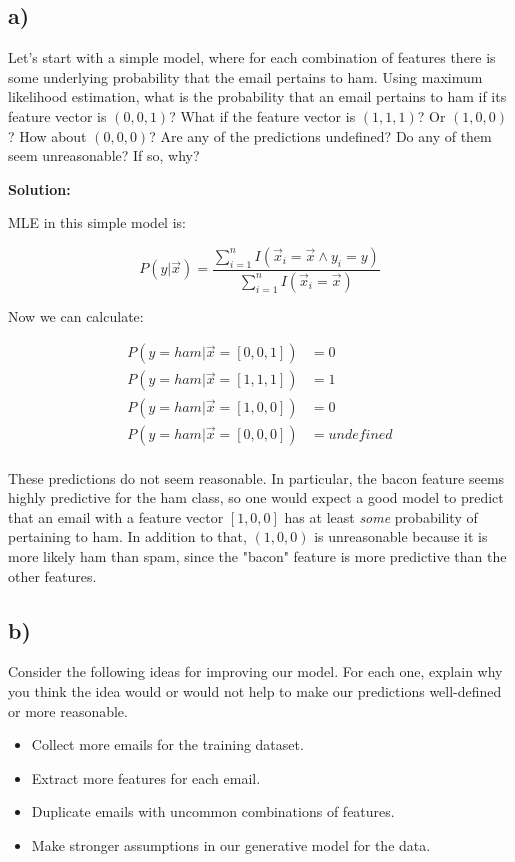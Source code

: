 \documentclass[a4paper]{article}
\begin{document}
\subsection*{a)}
Let's start with a simple model, where for each combination of features there is some underlying probability that the email pertains to ham. Using maximum likelihood estimation, what is the probability that an email pertains to ham if its feature vector is $(0,0,1)$? What if the feature vector is $(1,1,1)$? Or $(1,0,0)$? How about $(0,0,0)$? Are any of the predictions undefined? Do any of them seem unreasonable? If so, why?

\textbf{Solution:}

MLE in this simple model is:

$$P(y | \vec{x}) = \frac{\sum_{i=1}^nI(\vec{x}_i = \vec{x} \wedge y_i = y)}{\sum_{i=1}^nI(\vec{x}_i = \vec{x})}$$

Now we can calculate:

\begin{align*}
P(y = ham | \vec{x} = [0,0,1]) &= 0\\
P(y = ham | \vec{x} = [1,1,1]) &= 1\\
P(y = ham | \vec{x} = [1,0,0]) &= 0 \\
P(y = ham | \vec{x} = [0,0,0]) &= undefined\\
\end{align*}

These predictions do not seem reasonable. In particular, the bacon feature seems highly predictive for the ham class, so one would expect a good model to predict that an email with a feature vector $[1,0,0]$ has at least \textit{some} probability of pertaining to ham. In addition to that, $(1,0,0)$ is unreasonable because it is more likely ham than spam, since the "bacon" feature is more predictive than the other features. 


\subsection*{b)}
Consider the following ideas for improving our model. For each one, explain why you think the idea would or would not help to make our predictions well-defined or more reasonable.
\begin{itemize}
\item Collect more emails for the training dataset.
\item Extract more features for each email.
\item Duplicate emails with uncommon combinations of features.
\item Make stronger assumptions in our generative model for the data.
\end{itemize}
\end{document}
